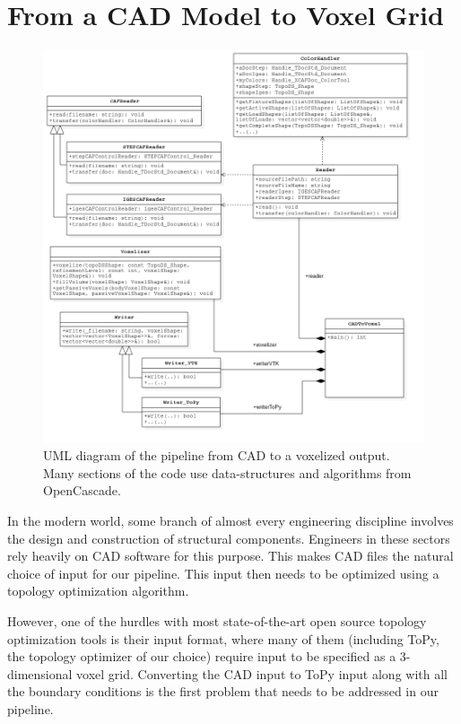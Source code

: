 \section{From a \acs{CAD} Model to Voxel Grid}
\label{sec: CADToVoxels}
\begin{figure}
  \includegraphics[scale=0.5]{Pictures/CADToVoxel/UML_Complete_PNG.png}
\caption{UML diagram of the pipeline from CAD to a voxelized output. Many sections of the code use data-structures and algorithms from OpenCascade\cite{OpenCascade}.}
\label{fig: umlCADToVoxel}
\end{figure}

In the modern world, some branch of almost every engineering discipline involves the design and construction of structural components. Engineers in these sectors rely heavily on CAD software for this purpose. This makes CAD files the natural choice of input for our pipeline. This input then needs to be optimized using a topology optimization algorithm.

However, one of the hurdles with most state-of-the-art open source topology optimization tools is their input format, where many of them (including ToPy, the topology optimizer of our choice) require input to be specified as a 3-dimensional voxel grid. Converting the CAD input to ToPy input along with all the boundary conditions is the first problem that needs to be addressed in our pipeline.

